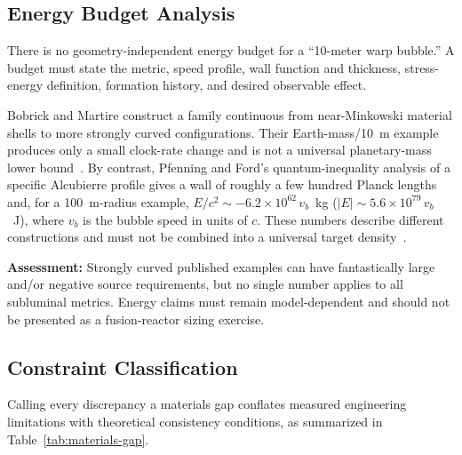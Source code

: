 \documentclass[aps,prd,twocolumn,superscriptaddress,nofootinbib,floatfix]{revtex4-2}
\begin{document}
\subsection{Energy Budget Analysis}\label{sec:energy-budget}

There is no geometry-independent energy budget for a ``10-meter warp bubble.'' A
budget must state the metric, speed profile, wall function and thickness,
stress-energy definition, formation history, and desired observable effect.

Bobrick and Martire construct a family continuous from near-Minkowski material
shells to more strongly curved configurations. Their Earth-mass/\SI{10}{m} example
produces only a small clock-rate change and is not a universal planetary-mass
lower bound~\cite{Alcubierre1994,BobrickMartire2021}. By contrast, Pfenning and
Ford's quantum-inequality analysis of a specific Alcubierre profile gives a wall of
roughly a few hundred Planck lengths and, for a \SI{100}{m}-radius example,
$E/c^{2}\sim-6.2\times10^{62}\,v_{b}$~kg
($|E|\sim5.6\times10^{79}\,v_{b}$~J), where $v_{b}$ is the bubble speed in units
of $c$. These numbers describe different constructions and must not be combined
into a universal target density~\cite{PfenningFord1997}.

\textbf{Assessment:} Strongly curved published examples can have fantastically
large and/or negative source requirements, but no single number applies to all
subluminal metrics. Energy claims must remain model-dependent and should not be
presented as a fusion-reactor sizing exercise.

\subsection{Constraint Classification}\label{sec:materials-gap}

Calling every discrepancy a materials gap conflates measured engineering
limitations with theoretical consistency conditions, as summarized in
Table~\ref{tab:materials-gap}.
\end{document}
